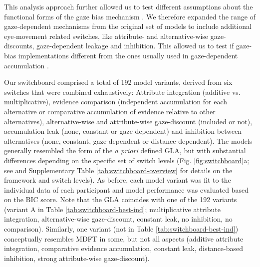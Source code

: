 \documentclass[11pt, a4paper]{article}
\begin{document}
This analysis approach further allowed us to test different assumptions about the functional forms of the gaze bias mechanism \parencite[e.g., as discounting non-ﬁxated alternatives’ values, controlling accumulation leak, among others; see][]{ashby2016FindingRightFit}. We therefore expanded the range of gaze-dependent mechanisms from the original set of models to include additional eye-movement related switches, like attribute- and alternative-wise gaze-discounts, gaze-dependent leakage and inhibition. This allowed us to test if gaze-bias implementations different from the ones usually used in gaze-dependent accumulation \parencite{fisher2017AttentionalDriftDiffusion,krajbich2010VisualFixationsComputation,krajbich2011MultialternativeDriftdiffusionModel,krajbich2012AttentionalDriftdiffusionModel,molter2019GLAMboxPythonToolbox,thomas2019GazeBiasDifferences,smith2018AttentionChoiceDomains,tavares2017AttentionalDriftDiffusion}.

Our switchboard comprised a total of 192 model variants, derived from six switches that were combined exhaustively: Attribute integration (additive vs. multiplicative), evidence comparison (independent accumulation for each alternative or comparative accumulation of evidence relative to other alternatives), alternative-wise and attribute-wise gaze-discount (included or not), accumulation leak (none, constant or gaze-dependent) and inhibition between alternatives (none, constant, gaze-dependent or distance-dependent). The models generally resembled the form of the \emph{a priori} defined GLA, but with substantial differences depending on the specific set of switch levels (Fig. \ref{fig:switchboard}a; see  and Supplementary Table \ref{tab:switchboard-overview} for details on the framework and switch levels). As before, each model variant was fit to the individual data of each participant and model performance was evaluated based on the BIC score. Note that the GLA coincides with one of the 192 variants (variant A in Table \ref{tab:switchboard-best-ind}; multiplicative attribute integration, alternative-wise gaze-discount, constant leak, no inhibition, no comparison). Similarly, one variant (not in Table \ref{tab:switchboard-best-ind}) conceptually resembles MDFT in some, but not all aspects (additive attribute integration, comparative evidence accumulation, constant leak, distance-based inhibition, strong attribute-wise gaze-discount).
\end{document}
